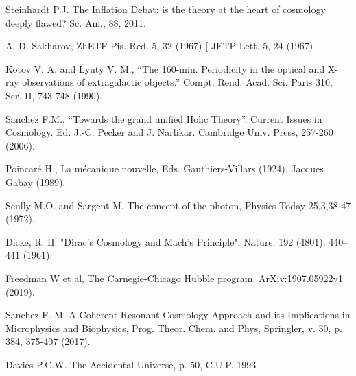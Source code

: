 \documentclass[a4paper,9pt]{article}
\begin{document}
\begin{thebibliography}{99}

 Steinhardt P.J. The Inflation Debat: is the theory at the heart of cosmology deeply flawed? Sc. Am., 88, 2011.

A. D. Sakharov, ZhETF Pis. Red. 5, 32 (1967) [ JETP Lett. 5, 24 (1967)

 Kotov V. A. and Lyuty V. M., “The 160-min. Periodicity in the optical and X-ray observations of extragalactic objects.” Compt. Rend. Acad. Sci. Paris 310, Ser. II, 743-748 (1990).

 Sanchez F.M., “Towards the grand unified Holic Theory”. Current Issues in Cosmology. Ed. J.-C. Pecker and J. Narlikar. Cambridge Univ. Press, 257-260 (2006).


 Poincaré H., La mécanique nouvelle, Eds. Gauthiers-Villars (1924), Jacques Gabay (1989).


 Scully M.O. and Sargent M. The concept of the photon, Physics Today 25,3,38-47 (1972).



 Dicke, R. H. "Dirac's Cosmology and Mach's Principle". Nature. 192 (4801): 440–441 (1961). 

 Freedman W et al, The Carnegie-Chicago Hubble program. ArXiv:1907.05922v1 (2019).




 Sanchez F. M. A Coherent Resonant Cosmology Approach and its Implications in Microphysics and Biophysics, Prog. Theor. Chem. and Phys, Springler, v. 30, p. 384, 375-407 (2017).

 Davies P.C.W. The Accidental Universe, p. 50, C.U.P. 1993








\end{thebibliography}
\end{document}
